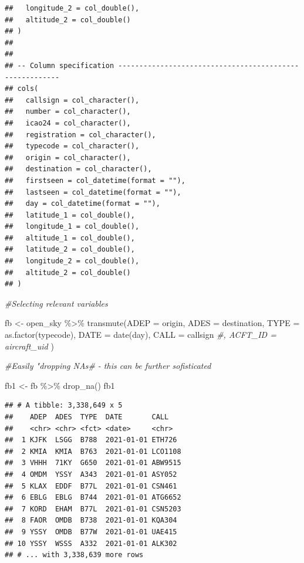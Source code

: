 \documentclass[conference,final,]{IEEEtran}
\newenvironment{Shaded}{\begin{snugshade}}{\end{snugshade}}
\newcommand{\AttributeTok}[1]{\textcolor[rgb]{0.77,0.63,0.00}{#1}}
\newcommand{\CommentTok}[1]{\textcolor[rgb]{0.56,0.35,0.01}{\textit{#1}}}
\newcommand{\FunctionTok}[1]{\textcolor[rgb]{0.00,0.00,0.00}{#1}}
\newcommand{\NormalTok}[1]{#1}
\newcommand{\OtherTok}[1]{\textcolor[rgb]{0.56,0.35,0.01}{#1}}
\newcommand{\SpecialCharTok}[1]{\textcolor[rgb]{0.00,0.00,0.00}{#1}}
\begin{document}
\begin{verbatim}
##   longitude_2 = col_double(),
##   altitude_2 = col_double()
## )
## 
## 
## -- Column specification --------------------------------------------------------
## cols(
##   callsign = col_character(),
##   number = col_character(),
##   icao24 = col_character(),
##   registration = col_character(),
##   typecode = col_character(),
##   origin = col_character(),
##   destination = col_character(),
##   firstseen = col_datetime(format = ""),
##   lastseen = col_datetime(format = ""),
##   day = col_datetime(format = ""),
##   latitude_1 = col_double(),
##   longitude_1 = col_double(),
##   altitude_1 = col_double(),
##   latitude_2 = col_double(),
##   longitude_2 = col_double(),
##   altitude_2 = col_double()
## )
\end{verbatim}

\begin{Shaded}
\begin{Highlighting}[]
\CommentTok{\#Selecting relevant variables}

\NormalTok{fb }\OtherTok{\textless{}{-}}\NormalTok{ open\_sky }\SpecialCharTok{\%\textgreater{}\%} \FunctionTok{transmute}\NormalTok{(}\AttributeTok{ADEP =}\NormalTok{ origin, }\AttributeTok{ADES =}\NormalTok{ destination, }\AttributeTok{TYPE =} \FunctionTok{as.factor}\NormalTok{(typecode), }\AttributeTok{DATE =} \FunctionTok{date}\NormalTok{(day), }\AttributeTok{CALL =}\NormalTok{ callsign}
                             \CommentTok{\#, ACFT\_ID = aircraft\_uid}
\NormalTok{                             )}


\CommentTok{\#Easily "dropping NA\textquotesingle{}s\# {-} this can be further sofisticated}

\NormalTok{fb1 }\OtherTok{\textless{}{-}}\NormalTok{ fb }\SpecialCharTok{\%\textgreater{}\%} \FunctionTok{drop\_na}\NormalTok{()}
\NormalTok{fb1}
\end{Highlighting}
\end{Shaded}

\begin{verbatim}
## # A tibble: 3,338,649 x 5
##    ADEP  ADES  TYPE  DATE       CALL   
##    <chr> <chr> <fct> <date>     <chr>  
##  1 KJFK  LSGG  B788  2021-01-01 ETH726 
##  2 KMIA  KMIA  B763  2021-01-01 LCO1108
##  3 VHHH  71KY  G650  2021-01-01 ABW9515
##  4 OMDM  YSSY  A343  2021-01-01 ASY052 
##  5 KLAX  EDDF  B77L  2021-01-01 CSN461 
##  6 EBLG  EBLG  B744  2021-01-01 ATG6652
##  7 KORD  EHAM  B77L  2021-01-01 CSN5203
##  8 FAOR  OMDB  B738  2021-01-01 KQA304 
##  9 YSSY  OMDB  B77W  2021-01-01 UAE415 
## 10 YSSY  WSSS  A332  2021-01-01 ALK302 
## # ... with 3,338,639 more rows
\end{verbatim}
\end{document}
